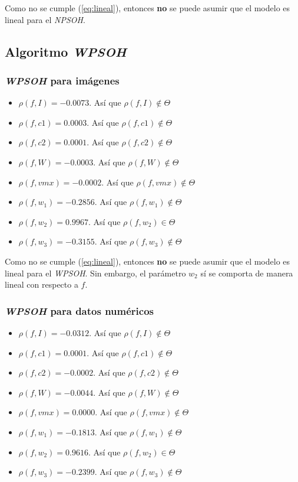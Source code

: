     Como no se cumple (\ref{eq:lineal}), entonces \textbf{no} se puede asumir
que el modelo es lineal para el \emph{NPSOH}.

\subsection{Algoritmo \emph{WPSOH}}

\subsubsection{\emph{WPSOH} para imágenes}
\begin{itemize}
    \item $\rho(f, I) = -0.0073$. Así que $\rho(f, I) \notin \Theta$
    \item $\rho(f, c1) = 0.0003$. Así que $\rho(f, c1) \notin \Theta$
    \item $\rho(f, c2) = 0.0001$. Así que $\rho(f, c2) \notin \Theta$
    \item $\rho(f, W) = -0.0003$. Así que $\rho(f, W) \notin \Theta$
    \item $\rho(f, vmx) = -0.0002$. Así que $\rho(f, vmx) \notin \Theta$
    \item $\rho(f, w_1) = -0.2856$. Así que $\rho(f, w_1) \notin \Theta$
    \item $\rho(f, w_2) = 0.9967$. Así que $\rho(f, w_2) \in \Theta$
    \item $\rho(f, w_3) = -0.3155$. Así que $\rho(f, w_3) \notin \Theta$
\end{itemize}

    Como no se cumple (\ref{eq:lineal}), entonces \textbf{no} se puede asumir
que el modelo es lineal para el \emph{WPSOH}. Sin embargo, el parámetro $w_2$ sí
se comporta de manera lineal con respecto a $f$.

\subsubsection{\emph{WPSOH} para datos numéricos}
\begin{itemize}
    \item $\rho(f, I) = -0.0312$. Así que $\rho(f, I) \notin \Theta$
    \item $\rho(f, c1) = 0.0001$. Así que $\rho(f, c1) \notin \Theta$
    \item $\rho(f, c2) = -0.0002$. Así que $\rho(f, c2) \notin \Theta$
    \item $\rho(f, W) = -0.0044$. Así que $\rho(f, W) \notin \Theta$
    \item $\rho(f, vmx) = 0.0000$. Así que $\rho(f, vmx) \notin \Theta$
    \item $\rho(f, w_1) = -0.1813$. Así que $\rho(f, w_1) \notin \Theta$
    \item $\rho(f, w_2) = 0.9616$. Así que $\rho(f, w_2) \in \Theta$
    \item $\rho(f, w_3) = -0.2399$. Así que $\rho(f, w_3) \notin \Theta$
\end{itemize}

